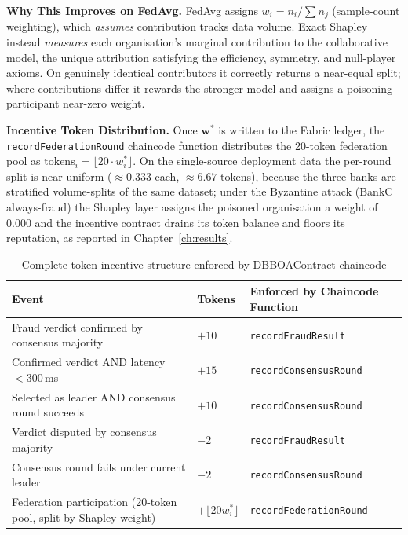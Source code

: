 \textbf{Why This Improves on FedAvg.}
FedAvg assigns $w_i = n_i / \sum n_j$ (sample-count weighting), which \emph{assumes} contribution tracks data volume. Exact Shapley instead \emph{measures} each organisation's marginal contribution to the collaborative model, the unique attribution satisfying the efficiency, symmetry, and null-player axioms. On genuinely identical contributors it correctly returns a near-equal split; where contributions differ it rewards the stronger model and assigns a poisoning participant near-zero weight.

\textbf{Incentive Token Distribution.}
Once $\mathbf{w}^\ast$ is written to the Fabric ledger, the \texttt{recordFederationRound} chaincode function distributes the 20-token federation pool as $\text{tokens}_i = \lfloor 20 \cdot w_i^\ast \rfloor$. On the single-source deployment data the per-round split is near-uniform ($\approx 0.333$ each, $\approx 6.67$ tokens), because the three banks are stratified volume-splits of the same dataset; under the Byzantine attack (BankC always-fraud) the Shapley layer assigns the poisoned organisation a weight of $0.000$ and the incentive contract drains its token balance and floors its reputation, as reported in Chapter~\ref{ch:results}.

\begin{table}[htbp]
\centering
\caption{Complete token incentive structure enforced by DBBOAContract chaincode}
\label{tab:token_structure}
\begin{tabular}{|p{6.5cm}|p{1.5cm}|p{5.5cm}|}
\hline
\textbf{Event} & \textbf{Tokens} & \textbf{Enforced by Chaincode Function} \\ \hline
Fraud verdict confirmed by consensus majority & $+10$ & \texttt{recordFraudResult} \\ \hline
Confirmed verdict AND latency $< 300$\,ms & $+15$ & \texttt{recordConsensusRound} \\ \hline
Selected as leader AND consensus round succeeds & $+10$ & \texttt{recordConsensusRound} \\ \hline
Verdict disputed by consensus majority & $-2$ & \texttt{recordFraudResult} \\ \hline
Consensus round fails under current leader & $-2$ & \texttt{recordConsensusRound} \\ \hline
Federation participation (20-token pool, split by Shapley weight) & $+\lfloor 20 w_i^\ast\rfloor$ & \texttt{recordFederationRound} \\ \hline
\end{tabular}
\end{table}


